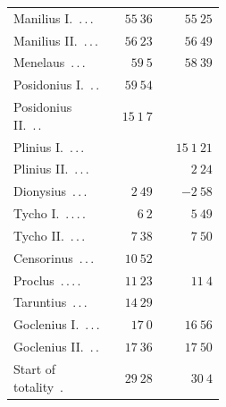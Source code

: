 \begin{center}
\begin{tabular}{@{}p{0.47\linewidth}|r|r@{}}
Manilius I.\ \mbox{.\,.\,.} & $55\ 36$ & $55\ 25$\\
Manilius II.\ \mbox{.\,.\,.} & $56\ 23$ & $56\ 49$\\
Menelaus\ \mbox{.\,.\,.} & $59\ 5$ & $58\ 39$\\
Posidonius I.\ \mbox{.\,.} & $59\ 54$ & \\
Posidonius II.\ \mbox{.\,.} & $15\ 1\ 7$ & \\
Plinius I.\ \mbox{.\,.\,.} &  & $15\ 1\ 21$\\
Plinius II.\ \mbox{.\,.\,.} &  & $2\ 24$\\
Dionysius\ \mbox{.\,.\,.} & $2\ 49$ & $-2\ 58$\\
Tycho I.\ \mbox{.\,.\,.\,.} & $6\ 2$ & $5\ 49$\\
Tycho II.\ \mbox{.\,.\,.} & $7\ 38$ & $7\ 50$\\
Censorinus\ \mbox{.\,.\,.} & $10\ 52$ & \\
Proclus\ \mbox{.\,.\,.\,.} & $11\ 23$ & $11\ 4$\\
Taruntius\ \mbox{.\,.\,.} & $14\ 29$ & \\
Goclenius I.\ \mbox{.\,.\,.} & $17\ 0$ & $16\ 56$\\
Goclenius II.\ \mbox{.\,.} & $17\ 36$ & $17\ 50$\\
Start of totality\ \mbox{.} & $29\ 28$ & $30\ 4$\\
\end{tabular}\endgroup\end{center}

